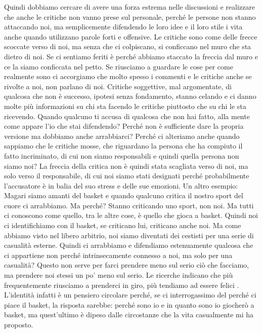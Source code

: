 \documentclass[12pt]{book} %
\begin{document}
Quindi dobbiamo cercare di avere una forza estrema nelle discussioni e realizzare che anche le critiche non vanno prese
sul personale, perché le persone non stanno attaccando noi, ma semplicemente difendendo le loro idee e il loro stile i
vita anche quando utilizzano parole forti e offensive. Le critiche sono come delle frecce scoccate verso di noi, ma
senza che ci colpiscano, si conficcano nel muro che sta dietro di noi. Se ci sentiamo feriti è perché abbiamo staccato
la freccia dal muro e ce la siamo conficcata nel petto. Se riusciamo a guardare le cose per come realmente sono ci
accorgiamo che molto spesso i commenti e le critiche anche se rivolte a noi, non parlano di noi. Critiche soggettive,
mal argomentate, di qualcosa che non è successo, ipotesi senza fondamento, stanno celando e ci danno molte più
informazioni su chi sta facendo le critiche piuttosto che su chi le sta ricevendo. Quando qualcuno ti accusa di
qualcosa che non hai fatto, alla mente come appare l'io che stai difendendo? Perché non è
sufficiente dare la propria versione ma dobbiamo anche arrabbiarci? Perché ci alteriamo anche quando sappiamo che le
critiche mosse, che riguardano la persona che ha compiuto il fatto incriminato, di cui non siamo responsabili e quindi
quella persona non siamo noi? La freccia della critica non è quindi stata scagliata verso di noi, ma solo verso il
responsabile, di cui noi siamo stati designati perché probabilmente l'accusatore è in balia del
suo stress e delle sue emozioni. Un altro esempio: Magari siamo amanti del basket e quando qualcuno critica il nostro
sport del cuore ci arrabbiamo. Ma perché? Stanno criticando uno sport, non noi. Ma tutti ci conoscono come quello, tra
le altre cose, è quello che gioca a basket. Quindi noi ci identifichiamo con il basket, se criticano lui, criticano
anche noi. Ma come abbiamo visto nel libero arbitrio, noi siamo diventati dei cestisti per una serie di casualità
esterne. Quindi ci arrabbiamo e difendiamo estenuamente qualcosa che ci appartiene non perché intrinsecamente connesso
a noi, ma solo per una casualità? Questo non serve per farci prendere meno sul serio ciò che facciamo, ma prendere noi
stessi un po' meno sul serio. 
Le ricerche indicano che più frequentemente riusciamo a prenderci in giro, più tendiamo ad essere felici .
L'identità infatti è un pensiero circolare
perché, se ci interrogassimo del perché ci piace il basket, la risposta sarebbe: perché sono io e in quanto sono io
giocherò a basket, ma quest'ultimo è dipeso dalle circostanze che la vita casualmente mi ha
proposto.\newline
\end{document}
